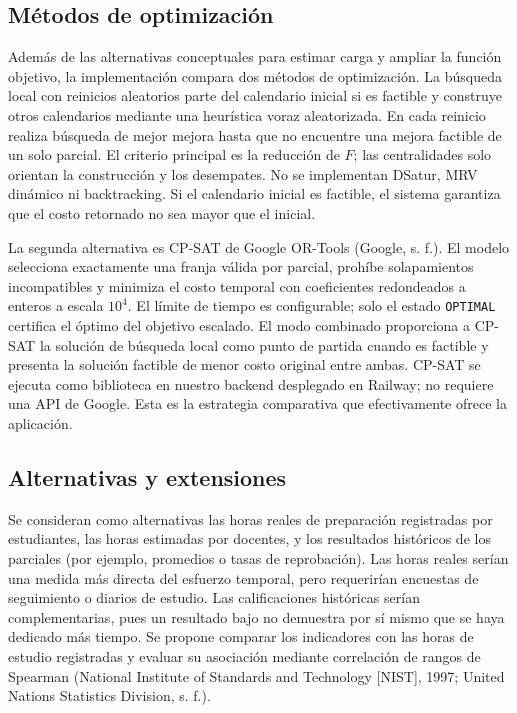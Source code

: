 \documentclass[12pt,letterpaper]{article}
\begin{document}
\subsection{Métodos de optimización}
Además de las alternativas conceptuales para estimar carga y ampliar la función objetivo, la implementación compara dos métodos de optimización. La búsqueda local con reinicios aleatorios parte del calendario inicial si es factible y construye otros calendarios mediante una heurística voraz aleatorizada. En cada reinicio realiza búsqueda de mejor mejora hasta que no encuentre una mejora factible de un solo parcial. El criterio principal es la reducción de $F$; las centralidades solo orientan la construcción y los desempates. No se implementan DSatur, MRV dinámico ni backtracking. Si el calendario inicial es factible, el sistema garantiza que el costo retornado no sea mayor que el inicial.

La segunda alternativa es CP-SAT de Google OR-Tools (Google, s. f.). El modelo selecciona exactamente una franja válida por parcial, prohíbe solapamientos incompatibles y minimiza el costo temporal con coeficientes redondeados a enteros a escala $10^4$. El límite de tiempo es configurable; solo el estado \texttt{OPTIMAL} certifica el óptimo del objetivo escalado. El modo combinado proporciona a CP-SAT la solución de búsqueda local como punto de partida cuando es factible y presenta la solución factible de menor costo original entre ambas. CP-SAT se ejecuta como biblioteca en nuestro backend desplegado en Railway; no requiere una API de Google. Esta es la estrategia comparativa que efectivamente ofrece la aplicación.

\subsection{Alternativas y extensiones}
Se consideran como alternativas las horas reales de preparación registradas por estudiantes, las horas estimadas por docentes, y los resultados históricos de los parciales (por ejemplo, promedios o tasas de reprobación). Las horas reales serían una medida más directa del esfuerzo temporal, pero requerirían encuestas de seguimiento o diarios de estudio. Las calificaciones históricas serían complementarias, pues un resultado bajo no demuestra por sí mismo que se haya dedicado más tiempo. Se propone comparar los indicadores con las horas de estudio registradas y evaluar su asociación mediante correlación de rangos de Spearman (National Institute of Standards and Technology [NIST], 1997; United Nations Statistics Division, s. f.).
\end{document}
